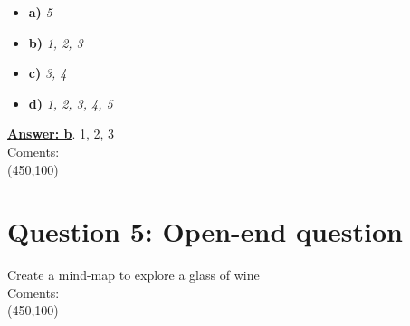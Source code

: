 \documentclass[12pt,a4paper,norsk]{article}
\begin{document}
\begin{itemize}
 \item \textbf{a)} \textit{5}
 \item \textbf{b)} \textit{1, 2, 3}
 \item \textbf{c)} \textit{3, 4}
 \item \textbf{d)} \textit{1, 2, 3, 4, 5}
\end{itemize}

\underline{\textbf{Answer: b}}. 1, 2, 3\\

\noindent Coments:\\
\framebox(450,100){}\\

\section {Question 5: Open-end question} Create a mind-map to explore a glass of wine\\

\noindent Coments:\\
\framebox(450,100){}\\
\end{document}
